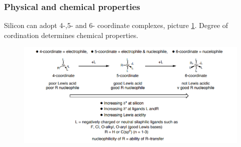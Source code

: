 \documentclass[
  digital, %
  table,   %
  lof,     %
  lot,     %
]{fithesis3}
\begin{document}
\subsubsection{Physical and chemical properties}
Silicon can adopt 4-,5- and 6- coordinate complexes, picture \ref{schema_silicon_coordinate}. Degree of cordination determines chemical properties.
\begin{figure}[h!]
\caption{\cite{hypervalentsiliconmacmillangroup2005}}
  \center
  \includegraphics[width=12cm]{schema_silicophosphates.png}
  \label{schema_silicon_coordinate}
  \end{figure}
\end{document}
